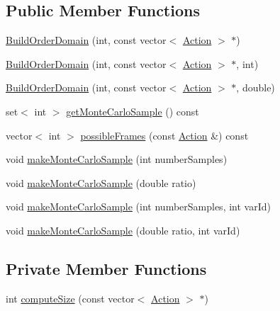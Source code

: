 \subsection*{Public Member Functions}
\begin{DoxyCompactItemize}
\item 
\hyperlink{classghost_1_1BuildOrderDomain_a5cfeef0e729cb67dd15023fb30027cb1}{Build\-Order\-Domain} (int, const vector$<$ \hyperlink{classghost_1_1Action}{Action} $>$ $\ast$)
\item 
\hyperlink{classghost_1_1BuildOrderDomain_a0b40a027f1a792d1203b693c0fea68b7}{Build\-Order\-Domain} (int, const vector$<$ \hyperlink{classghost_1_1Action}{Action} $>$ $\ast$, int)
\item 
\hyperlink{classghost_1_1BuildOrderDomain_a62000315cb61fed47d700ae148ae7ee8}{Build\-Order\-Domain} (int, const vector$<$ \hyperlink{classghost_1_1Action}{Action} $>$ $\ast$, double)
\item 
set$<$ int $>$ \hyperlink{classghost_1_1BuildOrderDomain_ac8530ce1ff1cbb61178c9431418bd14b}{get\-Monte\-Carlo\-Sample} () const 
\item 
vector$<$ int $>$ \hyperlink{classghost_1_1BuildOrderDomain_aba384a4becdc798268a80ccaf8b9499c}{possible\-Frames} (const \hyperlink{classghost_1_1Action}{Action} \&) const 
\item 
void \hyperlink{classghost_1_1BuildOrderDomain_aacfb6713544796539210cf6f6ade6776}{make\-Monte\-Carlo\-Sample} (int number\-Samples)
\item 
void \hyperlink{classghost_1_1BuildOrderDomain_a4eb69d23939e5d21d212956bf4d49f15}{make\-Monte\-Carlo\-Sample} (double ratio)
\item 
void \hyperlink{classghost_1_1BuildOrderDomain_a03c37a1343e3229415f2f58031ced5d7}{make\-Monte\-Carlo\-Sample} (int number\-Samples, int var\-Id)
\item 
void \hyperlink{classghost_1_1BuildOrderDomain_abacca32a260084c05add39affb473783}{make\-Monte\-Carlo\-Sample} (double ratio, int var\-Id)
\end{DoxyCompactItemize}
\subsection*{Private Member Functions}
\begin{DoxyCompactItemize}
\item 
int \hyperlink{classghost_1_1BuildOrderDomain_ae5dba154b4ad4be14dc65e6f4e72087a}{compute\-Size} (const vector$<$ \hyperlink{classghost_1_1Action}{Action} $>$ $\ast$)
\end{DoxyCompactItemize}
